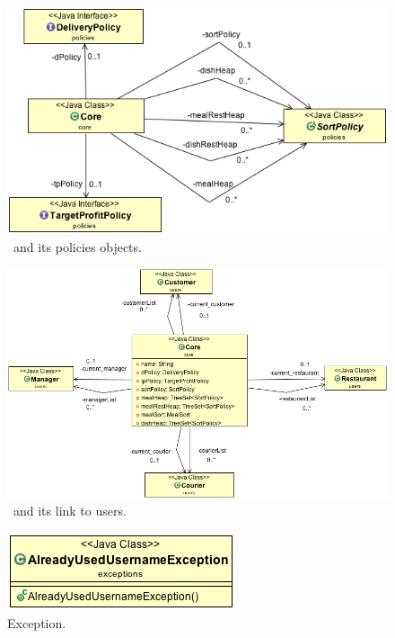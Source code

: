 \begin{figure}
  \begin{center}
    \includegraphics[scale=0.5]{./img/CoreToPolicies.png}
    \end{center}
  \caption{\umld \Core~and its policies objects.}
  \label{fig:core_policies_uml}
\end{figure}
\begin{figure}
  \begin{center}
    \includegraphics[scale=0.5]{./img/CoreToUsers.png}
    \end{center}
  \caption{\umld \Core~and its link to users.}
  \label{fig:core_users_uml}
\end{figure}
\begin{figure}
  \begin{center}
    \includegraphics[scale=0.57]{./img/Exceptions.png}
    \end{center}
  \caption{\umld Exception.}
  \label{fig:exception_uml}
\end{figure}
